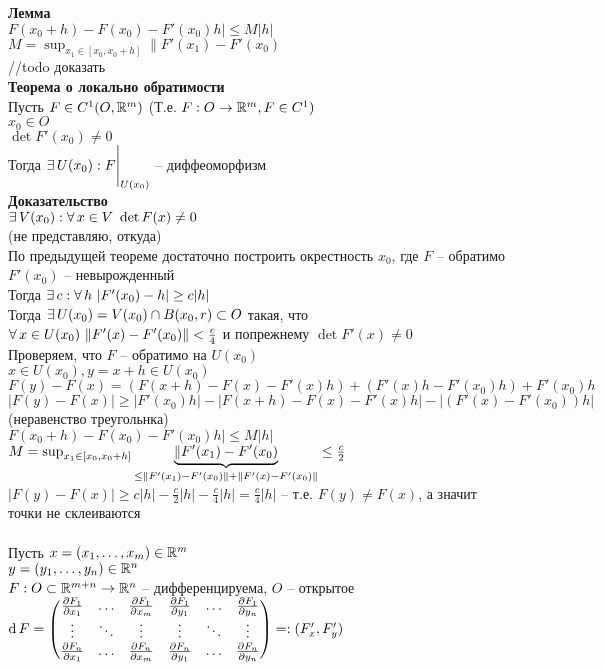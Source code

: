 \documentclass[12pt]{article}
\newcommand{\ppart}[2]{\frac{\partial #1}{\partial #2}}
\begin{document}
\textbf{Лемма}\\
$F(x_0+h)-F(x_0) - F'(x_0)h| \leq M|h|$\\
$M=\sup_{x_1\in [x_0, x_0+h]} \|F'(x_1)-F'(x_0)$\\
//todo доказать\\
\textbf{Теорема о локально обратимости}\\
Пусть $F \in C^1(O, \Rset^m)$ (Т.е. $F: O \rto \Rset^m, F \in C^1)$\\
$x_0 \in O$\\
$\det F'(x_0) \neq 0$\\
Тогда $\ex U(x_0): F\vl_{U(x_0)}$ -- диффеоморфизм\\
\textbf{Доказательство}\\
$\ex V(x_0): \fall x \in V\ \det F(x) \neq 0$\\
(не представляю, откуда)\\
По предыдущей теореме достаточно построить окрестность $x_0$, где $F$ -- обратимо\\
$F'(x_0)$ -- невырожденный\\
Тогда $\ex c: \fall h\ |F'(x_0)-h| \geq c|h|$\\
Тогда $\ex U(x_0) = V(x_0) \cap B(x_0, r) \subset O$ такая, что $\fall x \in U(x_0)\ \|F'(x)-F'(x_0)\| < \frac c4$ и попрежнему $\det F'(x) \neq 0$\\
Проверяем, что $F$ -- обратимо на $U(x_0)$\\
$x \in U(x_0), y = x+h \in U(x_0)$\\
$F(y)-F(x) = (F(x+h)-F(x)-F'(x)h) + (F'(x)h-F'(x_0)h)+F'(x_0)h$\\
$|F(y)-F(x)|\geq |F'(x_0)h| - |F(x+h)-F(x)-F'(x)h| - |(F'(x)-F'(x_0))h|$ (неравенство треугольнка)\\
$F(x_0+h)-F(x_0) - F'(x_0)h| \leq M|h|$\\
$M=\sup_{x_1\in [x_0, x_0+h]} \ub{\leq \|F'(x_1)-F'(x_0)\| + \|F'(x)-F'(x_0)\|}{\|F'(x_1)-F'(x_0)} \leq \frac c2$\\
$|F(y)-F(x)| \geq c|h|-\frac c2|h| - \frac c4|h| = \frac c4|h|$ -- т.е. $F(y)\neq F(x)$, а значит точки не склеиваются\\\\
Пусть $x = (x_1, \ldots, x_m) \in \Rset^m$\\
$y = (y_1, \ldots, y_n) \in \Rset^n$\\
$F:O\subset \Rset^{m+n} \rto \Rset^n$ -- дифференцируема, $O$ -- открытое\\
$\df F = \begin{pmatrix}
    \ppart {F_1}{x_1} & \ldots & \ppart {F_1}{x_m} & \ppart {F_1}{y_1} & \ldots & \ppart {F_1}{y_n}\\
    \vdots & \ddots & \vdots & \vdots & \ddots & \vdots\\
    \ppart {F_n}{x_1} & \ldots & \ppart {F_n}{x_m} & \ppart {F_n}{y_1} & \ldots & \ppart {F_n}{y_n}
\end{pmatrix} =: (F'_x, F'_y)$\\
\end{document}
